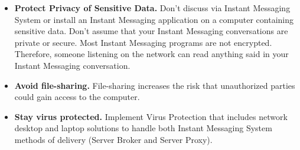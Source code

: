 \begin{itemize}
    \item \textbf{Protect Privacy of Sensitive Data.}
    Don't discuss via Instant Messaging System or install an Instant Messaging application on a computer containing
    sensitive data.
    Don't assume that your Instant Messaging conversations are private or secure.
    Most Instant Messaging programs are not encrypted.
    Therefore, someone listening on the network can read anything said in your Instant Messaging conversation.
    \item \textbf{Avoid file-sharing.}
    File-sharing increases the risk that unauthorized parties could gain access to the computer.
    \item \textbf{Stay virus protected.} Implement Virus Protection that includes network desktop and laptop solutions to handle both Instant Messaging System
    methods of delivery (Server Broker and Server Proxy).
\end{itemize}